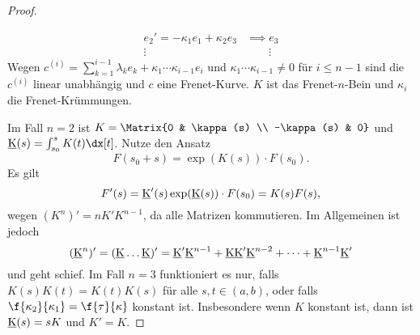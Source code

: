 \begin{st}
\begin{proof}
\begin{enumerate}[1.]
\begin{align*}
					e_2' = -\kappa_1 e_1 + \kappa_2 e_3 &\implies e_3 \\
					\vdots &\qquad \vdots
				\end{align*}
				Wegen $c^{(i)} = \sum_{k=1}^{i-1} \lambda_k e_k + \kappa_1 \dotsb \kappa_{i-1} e_i$ und $\kappa_1 \dotsb \kappa_{i-1} \neq 0$ für $i \le n-1$ sind die $c^{(i)}$ linear unabhängig und $c$ eine Frenet-Kurve.
				$K$ ist das Frenet-$n$-Bein und $\kappa_i$ die Frenet-Krümmungen.
		\end{enumerate}
		Im Fall $n=2$ ist $K= \Matrix{0 & \kappa(s) \\ -\kappa(s) & 0}$ und $\v K(s) = \int_{s_0}^s K(t) \dx[t]$.
		Nutze den Ansatz
		\[
			F(s_0 + s) = \exp (K(s)) \cdot F(s_0).
		\]
		Es gilt
		\[
			F'(s)
			= \underbar{K}'(s) \exp(\underbar{K}(s)) \cdot F(s_0)
			= K(s) F(s),
		\]
		wegen $(K^n)' = n K' K^{n-1}$, da alle Matrizen kommutieren.
		Im Allgemeinen ist jedoch
		\[
			(\underbar{K}^n)'
			= (\underbar{K} \dotsc \underbar{K})'
			= \underbar{K}' \underbar{K}^{n-1} + \underbar{K} \underbar{K}' \underbar{K}^{n-2} + \dotsb + \underbar{K}^{n-1} \underbar{K}'
		\]
		und geht schief.
		Im Fall $n=3$ funktioniert es nur, falls $K(s) K(t) = K(t) K(s)$ für alle $s, t \in (a,b)$, oder falls $\f {\kappa_2}{\kappa_1} = \f {\tau}{\kappa}$ konstant ist.
		Insbesondere wenn $K$ konstant ist, dann ist $\underbar{K}(s) = sK$ und $K' = K$.
	\end{proof}
\end{st}


